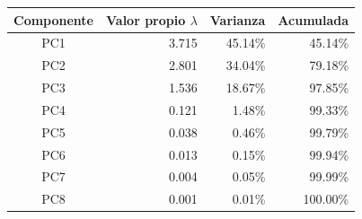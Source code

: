 \small
\begin{tabular}{crrr}
\toprule
Componente & Valor propio $\lambda$ & Varianza & Acumulada \\
\midrule
PC1 & 3.715 & 45.14\% & 45.14\% \\
PC2 & 2.801 & 34.04\% & 79.18\% \\
PC3 & 1.536 & 18.67\% & 97.85\% \\
PC4 & 0.121 & 1.48\% & 99.33\% \\
PC5 & 0.038 & 0.46\% & 99.79\% \\
PC6 & 0.013 & 0.15\% & 99.94\% \\
PC7 & 0.004 & 0.05\% & 99.99\% \\
PC8 & 0.001 & 0.01\% & 100.00\% \\
\bottomrule
\end{tabular}
